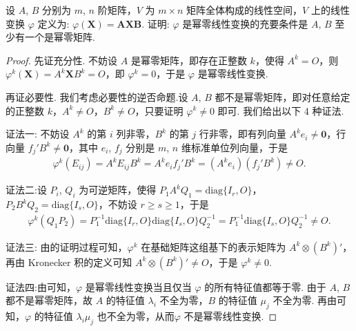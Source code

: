 \documentclass[../../main.tex]{subfiles}
\begin{document}
\begin{example}
设 $A$, $B$ 分别为 $m$, $n$ 阶矩阵，$V$ 为 $m\times n$ 矩阵全体构成的线性空间，$V$ 上的线性变换 $\varphi$ 定义为: $\varphi(\boldsymbol{X}) = \boldsymbol{A}\boldsymbol{X}\boldsymbol{B}$. 证明: $\varphi$ 是幂零线性变换的充要条件是 $A$, $B$ 至少有一个是幂零矩阵.
\end{example}
\begin{proof}
先证充分性. 不妨设 $A$ 是幂零矩阵，即存在正整数 $k$，使得 $A^k = O$，则 $\varphi^k(\boldsymbol{X}) = A^k\boldsymbol{X}B^k = O$，即 $\varphi^k = 0$，于是 $\varphi$ 是幂零线性变换.

再证必要性. 我们考虑必要性的逆否命题.设 $A$, $B$ 都不是幂零矩阵，即对任意给定的正整数 $k$，$A^k\neq O$，$B^k\neq O$，只要证明 $\varphi^k\neq 0$ 即可. 我们给出以下 4 种证法.

{\color{blue}证法一:}
不妨设 $A^k$ 的第 $i$ 列非零，$B^k$ 的第 $j$ 行非零，即有列向量 $A^ke_i\neq \boldsymbol{0}$，行向量 $f_j'B^k\neq \boldsymbol{0}$，其中 $e_i$, $f_j$ 分别是 $m$, $n$ 维标准单位列向量，于是
\begin{align*}
\varphi^k(E_{ij}) = A^kE_{ij}B^k = A^ke_if_j'B^k = (A^ke_i)(f_j'B^k)\neq O.
\end{align*}

{\color{blue}证法二:}设 $P_i$, $Q_i$ 为可逆矩阵，使得 $P_1A^kQ_1 = \mathrm{diag}\{I_r, O\}$，$P_2B^kQ_2 = \mathrm{diag}\{I_s, O\}$，不妨设 $r\geqslant  s\geqslant  1$，于是
\begin{align*}
\varphi^k(Q_1P_2) = P_1^{-1}\mathrm{diag}\{I_r, O\}\mathrm{diag}\{I_s, O\}Q_2^{-1} = P_1^{-1}\mathrm{diag}\{I_s, O\}Q_2^{-1}\neq O.
\end{align*}

{\color{blue}证法三:} 由的证明过程可知，$\varphi^k$ 在基础矩阵这组基下的表示矩阵为 $A^k\otimes (B^k)'$，再由 Kronecker 积的定义可知 $A^k\otimes (B^k)'\neq O$，于是 $\varphi^k\neq 0$.

{\color{blue}证法四:}由可知，$\varphi$ 是幂零线性变换当且仅当 $\varphi$ 的所有特征值都等于零. 由于 $A$, $B$ 都不是幂零矩阵，故 $A$ 的特征值 $\lambda_i$ 不全为零，$B$ 的特征值 $\mu_j$ 不全为零. 再由可知，$\varphi$ 的特征值 $\lambda_i\mu_j$ 也不全为零，从而$\varphi$ 不是幂零线性变换.

\end{proof}
\end{document}
